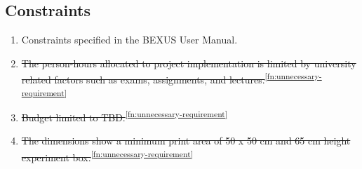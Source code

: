 \subsection{Constraints}

\begin{enumerate}[label=C.\arabic*]
    \item Constraints specified in the BEXUS User Manual.
    \item \st{The person-hours allocated to project implementation is limited by university related factors such as exams, assignments, and lectures.}\textsuperscript{\ref{fn:unnecessary-requirement}}
    \item \st{Budget limited to TBD.}\textsuperscript{\ref{fn:unnecessary-requirement}}
    \item \st{The dimensions show a minimum print area of 50 x 50 cm and 65 cm height experiment box.}\textsuperscript{\ref{fn:unnecessary-requirement}}
\end{enumerate}